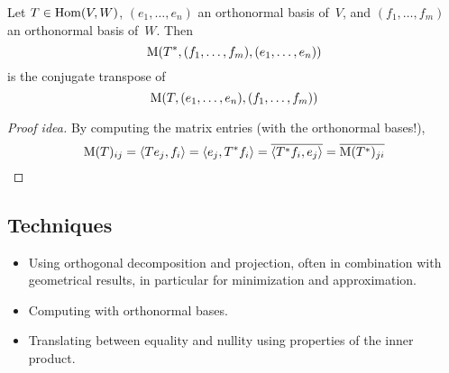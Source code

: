 \begin{thm}
Let \(T\in\operatorname{Hom}(V,W)\), \((e_1,\ldots,e_n)\) an orthonormal basis of~\(V\), and \((f_1,\ldots,f_m)\) an orthonormal basis of~\(W\). Then
\[\operatorname{M}(T^*,(f_1,\ldots,f_m),(e_1,\ldots,e_n))\]
is the conjugate transpose of
\[\operatorname{M}(T,(e_1,\ldots,e_n),(f_1,\ldots,f_m))\]
\end{thm}
\begin{proof}[Proof idea]
By computing the matrix entries (with the orthonormal bases!),
\begin{equation*}
\operatorname{M}(T)_{ij}=\langle{Te_j},{f_i}\rangle=\langle{e_j},{T^*f_i}\rangle=\overline{\langle{T^*f_i},{e_j}\rangle}=\overline{\operatorname{M}(T^*)_{ji}}\qedhere
\end{equation*}
\end{proof}

\subsection*{Techniques}
\begin{itemize}[itemsep=0pt]
\item Using orthogonal decomposition and projection, often in combination with geometrical results, in particular for minimization and approximation.
\item Computing with orthonormal bases.
\item Translating between equality and nullity using properties of the inner product.
\end{itemize}
